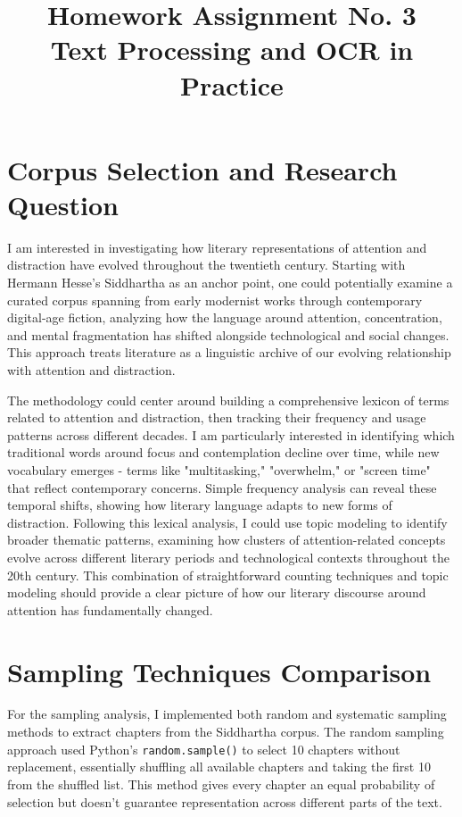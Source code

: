 \documentclass[12pt]{article}
\title{\textbf{Homework Assignment No. 3}\\
\large Text Processing and OCR in Practice}
\author{}
\date{}
\begin{document}
\maketitle

\section*{Corpus Selection and Research Question}

I am interested in investigating how literary representations of attention and distraction have evolved throughout the twentieth century. Starting with Hermann Hesse's Siddhartha as an anchor point, one could potentially examine a curated corpus spanning from early modernist works through contemporary digital-age fiction, analyzing how the language around attention, concentration, and mental fragmentation has shifted alongside technological and social changes. This approach treats literature as a linguistic archive of our evolving relationship with attention and distraction.

The methodology could center around building a comprehensive lexicon of terms related to attention and distraction, then tracking their frequency and usage patterns across different decades. I am particularly interested in identifying which traditional words around focus and contemplation decline over time, while new vocabulary emerges - terms like "multitasking," "overwhelm," or "screen time" that reflect contemporary concerns. Simple frequency analysis can reveal these temporal shifts, showing how literary language adapts to new forms of distraction. Following this lexical analysis, I could use topic modeling to identify broader thematic patterns, examining how clusters of attention-related concepts evolve across different literary periods and technological contexts throughout the 20th century. This combination of straightforward counting techniques and topic modeling should provide a clear picture of how our literary discourse around attention has fundamentally changed.

\section*{Sampling Techniques Comparison}

For the sampling analysis, I implemented both random and systematic sampling methods to extract chapters from the Siddhartha corpus. The random sampling approach used Python's \texttt{random.sample()} to select 10 chapters without replacement, essentially shuffling all available chapters and taking the first 10 from the shuffled list. This method gives every chapter an equal probability of selection but doesn't guarantee representation across different parts of the text.
\end{document}

